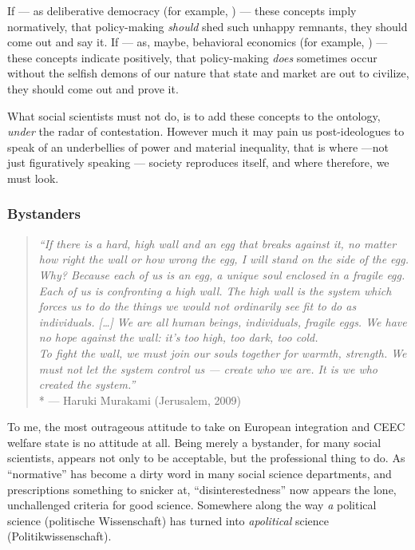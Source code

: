 If --- as deliberative democracy (for example, \citealt{Elster-1998-aa}) --- these concepts imply normatively, that policy-making \emph{should} shed such unhappy remnants, they should come out and say it.
If --- as, maybe, behavioral economics (for example, \citealt{Tomasello2009}) --- these concepts indicate positively, that policy-making \emph{does} sometimes occur without the selfish demons of our nature that state and market are out to civilize, they should come out and prove it.

What social scientists must not do, is to add these concepts to the ontology, \emph{under} the radar of contestation.
However much it may pain us post-ideologues to speak of \citeauthor{Agnoli-1989-aa}an underbellies of power and material inequality, that is where ---not just figuratively speaking --- society reproduces itself, and where therefore, we must look.

\subsubsection{Bystanders}

\begin{quotation}
	\emph{``If there is a hard, high wall and an egg that breaks against it, no matter how right the wall or how wrong the egg, I will stand on the side of the egg.
	\\
	Why?
	Because each of us is an egg, a unique soul enclosed in a fragile egg.
	Each of us is confronting a high wall.
	The high wall is the system which forces us to do the things we would not ordinarily see fit to do as individuals.
	[\ldots] We are all human beings, individuals, fragile eggs.
	We have no hope against the wall:
	it's too high, too dark, too cold.
	\\
	To fight the wall, we must join our souls together for warmth, strength.
	We must not let the system control us --- create who we are.
	It is we who created the system.''}
	\\*
	--- Haruki Murakami (Jerusalem, 2009)
\end{quotation}

To me, the most outrageous attitude to take on European integration and \gls{CEEC} welfare state is no attitude at all.
Being merely a bystander, for many social scientists, appears not only to be acceptable, but the professional thing to do.
As ``normative'' has become a dirty word in many social science departments, and prescriptions something to snicker at, ``disinterestedness'' now appears the lone, unchallenged criteria for good science.
Somewhere along the way \emph{a} political science (politische Wissenschaft) has turned into \emph{apolitical} science (Politikwissenschaft).

